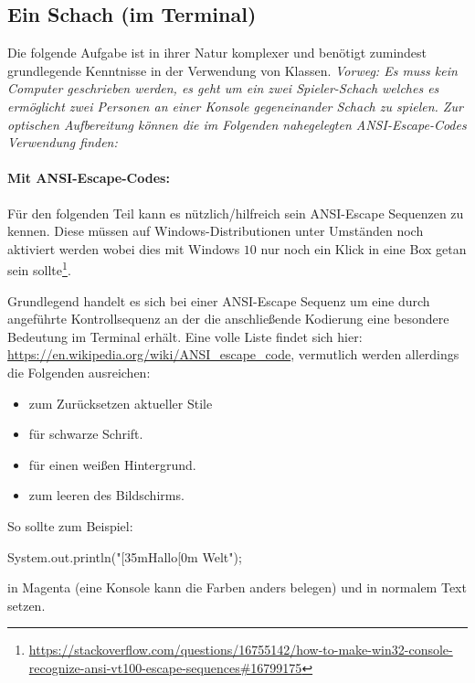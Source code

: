 \documentclass[table]{sopra-base}
\begin{document}
\subsection{Ein Schach (im Terminal)}
Die folgende Aufgabe ist in ihrer Natur komplexer und benötigt zumindest grundlegende Kenntnisse in der Verwendung von Klassen. \textit{Vorweg: Es muss kein Computer geschrieben
werden, es geht um ein zwei Spieler-Schach welches es ermöglicht zwei Personen an einer
Konsole gegeneinander Schach zu spielen. Zur optischen Aufbereitung können die im Folgenden nahegelegten ANSI-Escape-Codes Verwendung finden:}\par
\paragraph{Mit ANSI-Escape-Codes:}
Für den folgenden Teil kann es nützlich/hilfreich sein ANSI-Escape Sequenzen zu kennen. Diese müssen auf Windows-Distributionen unter Umständen noch aktiviert werden wobei dies mit Windows $10$ nur noch ein Klick in eine Box getan sein sollte\footnote{\url{https://stackoverflow.com/questions/16755142/how-to-make-win32-console-recognize-ansi-vt100-escape-sequences\#16799175}}.\par{}
Grundlegend handelt es sich bei einer ANSI-Escape Sequenz um eine durch \bjava{\\033[}
angeführte Kontrollsequenz an der die anschließende Kodierung eine besondere Bedeutung im
Terminal erhält. Eine volle Liste findet sich hier: \url{https://en.wikipedia.org/wiki/ANSI_escape_code}, vermutlich werden allerdings die Folgenden ausreichen:
\begin{multicols}{2}
    \begin{itemize}
        \item \say{\bjava{\\033[0m}} zum Zurücksetzen aktueller Stile
        \item \say{\bjava{\\033[30m}} für schwarze Schrift.
        \item \say{\bjava{\\033[47m}} für einen weißen Hintergrund.
        \item \say{\bjava{\\033[H\\033[2J}} zum leeren des Bildschirms.
    \end{itemize}
\end{multicols}
So sollte zum Beispiel:
\begin{java*}
System.out.println("[35mHallo[0m Welt");
\end{java*}
 in Magenta (eine Konsole kann die Farben anders belegen) und  in normalem Text setzen.
\end{document}
